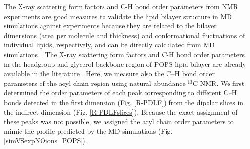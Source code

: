\documentclass[journal=jpcbfk,manuscript=article]{achemso}
\begin{document}
The X-ray scattering form factors and C-H bond order parameters from NMR experiments are good measures to validate
the lipid bilayer structure in MD simulations against experiments because they
are related to the bilayer dimensions (area per molecule and thickness) and
conformational fluctuations of individual lipids, respectively, and 
can be directly calculated from MD simulations~\cite{ollila16}.
The X-ray scattering form factors and C-H bond order parameters in
the headgroup and glycerol backbone region of POPS lipid bilayer are already available in the literature \cite{kucerka14,NMRlipidsIV}.
Here, we measure also the C--H bond order parameters of the acyl chain region using natural abundance $^{13}$C NMR.
We first determined the order parameters of each peak corresponding to different C--H bonds detected
in the first dimension (Fig. \ref{R-PDLF}) from the dipolar slices in the indirect dimension (Fig. \ref{R-PDLFslices}).
Because the exact assignment of these peaks was not possible, we assigned the
acyl chain order parameters to mimic the profile predicted by the MD simulations (Fig. \ref{simVSexpNOions_POPS}).
\end{document}
